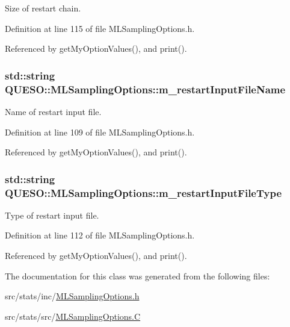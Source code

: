 Size of restart chain. 



Definition at line 115 of file M\-L\-Sampling\-Options.\-h.



Referenced by get\-My\-Option\-Values(), and print().

\hypertarget{class_q_u_e_s_o_1_1_m_l_sampling_options_aff68336a5d6ae4160e541975260450d8}{
\subsubsection[{m\-\_\-restart\-Input\-File\-Name}]{\setlength{\rightskip}{0pt plus 5cm}std\-::string Q\-U\-E\-S\-O\-::\-M\-L\-Sampling\-Options\-::m\-\_\-restart\-Input\-File\-Name}}\label{class_q_u_e_s_o_1_1_m_l_sampling_options_aff68336a5d6ae4160e541975260450d8}


Name of restart input file. 



Definition at line 109 of file M\-L\-Sampling\-Options.\-h.



Referenced by get\-My\-Option\-Values(), and print().

\hypertarget{class_q_u_e_s_o_1_1_m_l_sampling_options_aae8adcb5188369ea144d2144b53cde48}{
\subsubsection[{m\-\_\-restart\-Input\-File\-Type}]{\setlength{\rightskip}{0pt plus 5cm}std\-::string Q\-U\-E\-S\-O\-::\-M\-L\-Sampling\-Options\-::m\-\_\-restart\-Input\-File\-Type}}\label{class_q_u_e_s_o_1_1_m_l_sampling_options_aae8adcb5188369ea144d2144b53cde48}


Type of restart input file. 



Definition at line 112 of file M\-L\-Sampling\-Options.\-h.



Referenced by get\-My\-Option\-Values(), and print().



The documentation for this class was generated from the following files\-:\begin{DoxyCompactItemize}
\item 
src/stats/inc/\hyperlink{_m_l_sampling_options_8h}{M\-L\-Sampling\-Options.\-h}\item 
src/stats/src/\hyperlink{_m_l_sampling_options_8_c}{M\-L\-Sampling\-Options.\-C}\end{DoxyCompactItemize}
